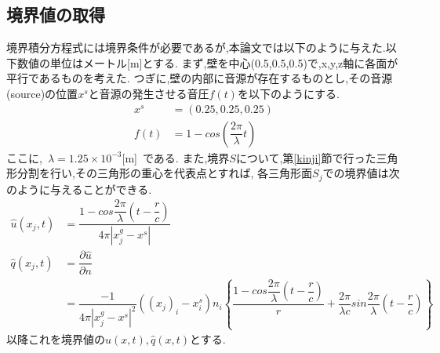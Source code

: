 \documentclass[dvipdfmx]{ampbt}
\begin{document}
\subsection{境界値の取得}
\label{境界値の取得}
境界積分方程式には境界条件が必要であるが,本論文では以下のように与えた.以下数値の単位はメートル[m]とする.
まず,壁を中心(0.5,0.5,0.5)で,x,y,z軸に各面が平行であるものを考えた.
つぎに,壁の内部に音源が存在するものとし,その音源(source)の位置$x^s$と音源の発生させる音圧$f(t)$を以下のようにする.
\begin{align}
x^s &= (0.25,0.25,0.25)\\
\label{ef:f(t)}
f(t) &= 1-cos(\dfrac{2 \pi}{\lambda}t)
\end{align}
ここに,\ $\lambda = 1.25 \times 10^{-3}$[m]\ である.
また,境界$S$について,第\ref{kinji}節で行った三角形分割を行い,その三角形の重心を代表点とすれば,
各三角形面$S_j$での境界値は次のように与えることができる.
\begin{align}
\hat{u}(x_j,t) &= \dfrac{1-cos\dfrac{2 \pi}{\lambda}(t-\dfrac{r}{c})}{4\pi|x^g_j-x^s|} \\
\hat{q}(x_j,t) &= \dfrac{\partial \hat{u}}{\partial n} \nonumber \\
               &= \dfrac{-1}{4\pi|x^g_j-x^s|^2}((x_j)_i-x^s_i)n_i \left\{ \dfrac{1-cos\dfrac{2 \pi}{\lambda}(t-\dfrac{r}{c})}{r} + \dfrac{2\pi}{\lambda c} sin\dfrac{2\pi}{\lambda}(t-\dfrac{r}{c})  \right\}
\end{align}
以降これを境界値の$\hat{u}(x,t),\hat{q}(x,t)$とする.
\end{document}
